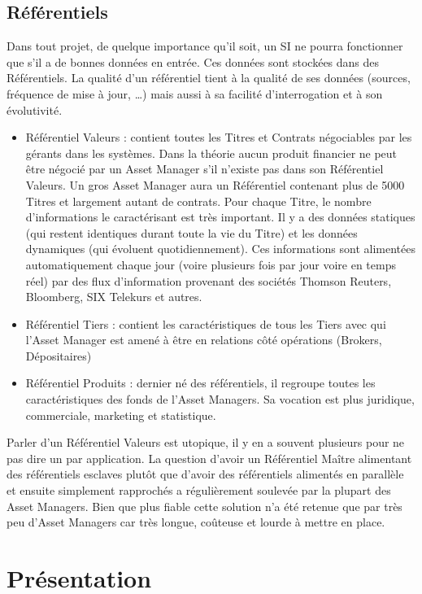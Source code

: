 \subsection{Référentiels} 
\par Dans tout projet, de quelque importance qu'il soit, un SI ne pourra fonctionner que s'il a de bonnes données en entrée. Ces données sont stockées dans des Référentiels. La qualité d'un référentiel tient à la qualité de ses données (sources, fréquence de mise à jour, …) mais aussi à sa facilité d'interrogation et à son évolutivité.
\begin{itemize}
    \item Référentiel Valeurs : contient toutes les Titres et Contrats négociables par les gérants dans les systèmes. Dans la théorie aucun produit financier ne peut être négocié par un Asset Manager s'il n'existe pas dans son Référentiel Valeurs. Un gros Asset Manager aura un Référentiel contenant plus de 5000 Titres et largement autant de contrats. Pour chaque Titre, le nombre d'informations le caractérisant est très important. Il y a des données statiques (qui restent identiques durant toute la vie du Titre) et les données dynamiques (qui évoluent quotidiennement). Ces informations sont alimentées automatiquement chaque jour (voire plusieurs fois par jour voire en temps réel) par des flux d'information provenant des sociétés Thomson Reuters, Bloomberg, SIX Telekurs et autres.
    \item Référentiel Tiers : contient les caractéristiques de tous les Tiers avec qui l'Asset Manager est amené à être en relations côté opérations (Brokers, Dépositaires)
    \item Référentiel Produits : dernier né des référentiels, il regroupe toutes les caractéristiques des fonds de l'Asset Managers. Sa vocation est plus juridique, commerciale, marketing et statistique.
\end{itemize}

\par Parler d'un Référentiel Valeurs est utopique, il y en a souvent plusieurs pour ne pas dire un par application. La question d'avoir un Référentiel Maître alimentant des référentiels esclaves plutôt que d'avoir des référentiels alimentés en parallèle et ensuite simplement rapprochés a régulièrement soulevée par la plupart des Asset Managers. Bien que plus fiable cette solution n'a été retenue que par très peu d'Asset Managers car très longue, coûteuse et lourde à mettre en place.

\section{Présentation}
